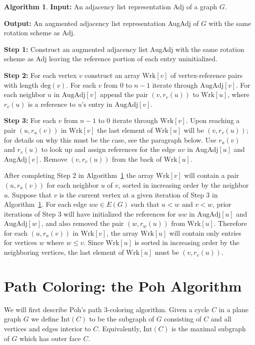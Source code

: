 \documentclass[12pt,letterpaper]{article}
\theoremstyle{plain}
\theoremstyle{definition}
\theoremstyle{break}
\newtheorem{algorithm}[lemma]{Algorithm}     %
\begin{document}
\begin{algorithm}\label{A:augment}
\textbf{Input:} An adjacency list representation Adj of a graph $G$.

\textbf{Output:} An augmented adjacency list representation AugAdj of
$G$ with the same rotation scheme as Adj.

\textbf{Step 1:} Construct an augmented adjacency list AugAdj with
the same rotation scheme as Adj leaving the reference portion of each entry
uninitialized.

\textbf{Step 2:} For each vertex $v$ construct an array $\text{Wrk}[v]$
of vertex-reference pairs with length $\text{deg}(v)$. For each $v$ from
$0$ to $n-1$ iterate through
$\text{AugAdj}[v]$. For each neighbor $u$ in $\text{AugAdj}[v]$ append the pair
$(v,r_v(u))$ to
$\text{Wrk}[u]$, where $r_v(u)$ is a reference to $u$'s entry in
$\text{AugAdj}[v]$.

\textbf{Step 3:} For each $v$ from $n-1$ to $0$ iterate through
$\text{Wrk}[v]$. Upon reaching a pair $(u,r_u(v))$ in $\text{Wrk}[v]$ the
last element of $\text{Wrk}[u]$ will be $(v,r_v(u))$; for details on why this
must be the case, see the paragraph below. Use
$r_u(v)$ and $r_v(u)$ to look up and assign references for the edge $uv$ in
AugAdj$[u]$ and AugAdj$[v]$. Remove $(v,r_v(u))$ from the back of
$\text{Wrk}[u]$.
\end{algorithm}

After completing Step $2$ in Algorithm~\ref{A:augment} the array $\text{Wrk}[v]$
will contain
a pair $(u,r_u(v))$ for each neighbor $u$ of $v$, sorted in increasing order by
the neighbor $u$.
Suppose that $v$ is the current vertex at a given iteration of Step $3$ in
Algorithm~\ref{A:augment}. For each edge $uw\in E(G)$ such that
$u<w$ and $v<w$, prior iterations of Step 3 will have initialized the
references for $uw$ in $\text{AugAdj}[u]$ and $\text{AugAdj}[w]$, and also
removed the pair
$(w,r_w(u))$ from $\text{Wrk}[u]$. Therefore for each $(u,r_u(v))$ in
$\text{Wrk}[v]$, the array $\text{Wrk}[u]$ will contain only entries for
vertices $w$ where $w\le v$. Since $\text{Wrk}[u]$ is sorted in
increasing order by the neighboring vertices, the last element of
$\text{Wrk}[u]$ must be $(v,r_v(u))$.

\section{Path Coloring: the Poh Algorithm}

We will first describe Poh's path $3$-coloring algorithm.
Given a cycle $C$ in a plane graph $G$ we define $\text{Int}(C)$ to
be the subgraph of $G$ consisting of $C$ and all vertices and edges interior to
$C$. Equivalently, $\text{Int}(C)$ is the maximal subgraph of $G$ which has
outer face $C$.
\end{document}
